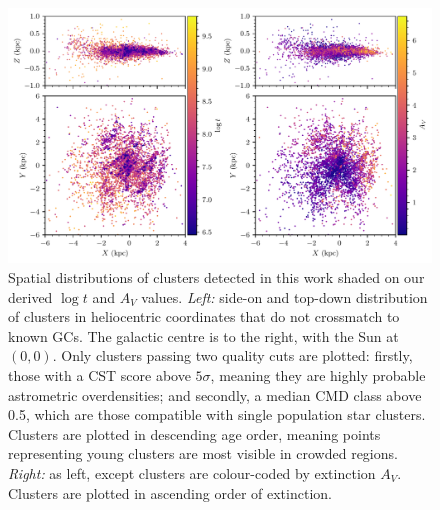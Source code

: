 \begin{figure}[t]
   \centering
   \includegraphics[width=\textwidth]{fig/c3/fig_results_age_distribution_all.pdf}
   \caption[Spatial distributions of clusters detected in this work shaded on our derived $\log t$ and $A_V$ values]{Spatial distributions of clusters detected in this work shaded on our derived $\log t$ and $A_V$ values. \emph{Left:} side-on and top-down distribution of clusters in heliocentric coordinates that do not crossmatch to known GCs. The galactic centre is to the right, with the Sun at $(0,0)$. Only clusters passing two quality cuts are plotted: firstly, those with a CST score above $5\sigma$, meaning they are highly probable astrometric overdensities; and secondly, a median CMD class above 0.5, which are those compatible with single population star clusters. Clusters are plotted in descending age order, meaning points representing young clusters are most visible in crowded regions. \emph{Right:} as left, except clusters are colour-coded by extinction $A_V$. Clusters are plotted in ascending order of extinction.}%
   \label{c3:fig:age_av_distribution}
\end{figure}


